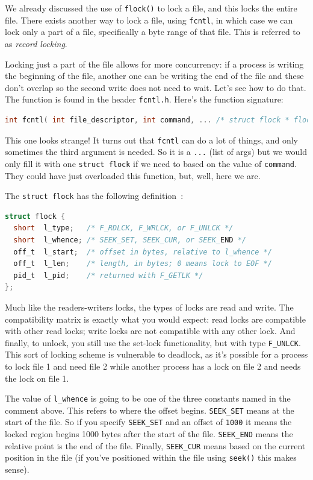We already discussed the use of \texttt{flock()} to lock a file, and this locks the entire file. There exists another way to lock a file, using \texttt{fcntl}, in which case we can lock only a part of a file, specifically a byte range of that file. This is referred to as \textit{record locking}.

Locking just a part of the file allows for more concurrency: if a process is writing the beginning of the file, another one can be writing the end of the file and these don't overlap so the second write does not need to wait. Let's see how to do that. The function is found in the header \texttt{fcntl.h}. Here's the function signature:

\begin{lstlisting}[language=C]
int fcntl( int file_descriptor, int command, ... /* struct flock * flockptr */ )
\end{lstlisting}

This one looks strange! It turns out that \texttt{fcntl} can do a lot of things, and only sometimes the third argument is needed. So it is a \texttt{...} (list of args) but we would only fill it with one \texttt{struct flock} if we need to based on the value of \texttt{command}. They could have just overloaded this function, but, well, here we are.

The \texttt{struct flock} has the following definition~\cite{apunix}:
\begin{lstlisting}[language=C]
struct flock {
  short  l_type;   /* F_RDLCK, F_WRLCK, or F_UNLCK */
  short  l_whence; /* SEEK_SET, SEEK_CUR, or SEEK_END */
  off_t  l_start;  /* offset in bytes, relative to l_whence */
  off_t  l_len;    /* length, in bytes; 0 means lock to EOF */
  pid_t  l_pid;    /* returned with F_GETLK */
};
\end{lstlisting}

Much like the readers-writers locks, the types of locks are read and write. The compatibility matrix is exactly what you would expect: read locks are compatible with other read locks; write locks are not compatible with any other lock. And finally, to unlock, you still use the set-lock functionality, but with type \texttt{F\_UNLCK}. This sort of locking scheme is vulnerable to deadlock, as it's possible for a process to lock file 1 and need file 2 while another process has a lock on file 2 and needs the lock on file 1.

The value of \texttt{l\_whence} is going to be one of the three constants named in the comment above. This refers to where the offset begins. \texttt{SEEK\_SET} means at the start of the file. So if you specify \texttt{SEEK\_SET} and an offset of \texttt{1000} it means the locked region begins 1000 bytes after the start of the file. \texttt{SEEK\_END} means the relative point is the end of the file. Finally, \texttt{SEEK\_CUR} means based on the current position in the file (if you've positioned within the file using \texttt{seek()} this makes sense).

